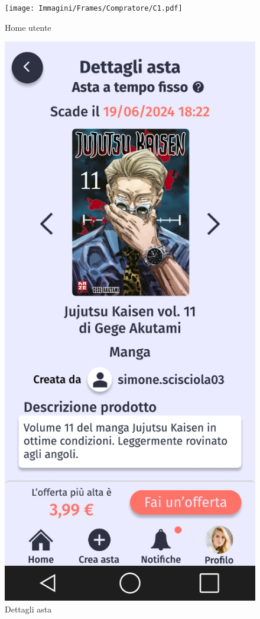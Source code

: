         \begin{figure}[!htb]
            \begin{minipage}{0.32\textwidth}
                    \centering
                    \texttt{[image: Immagini/Frames/Compratore/C1.pdf]}
                    \caption{Home utente}
            \end{minipage}\hfill
            \begin{minipage}{0.32\textwidth}
                    \centering
                    \includegraphics[width=.7\linewidth]{Immagini/Frames/Compratore/C7.pdf}
                    \caption{Dettagli asta}
            \end{minipage}\hfill
            \begin{minipage}{0.32\textwidth}

\end{minipage}
\end{figure}

